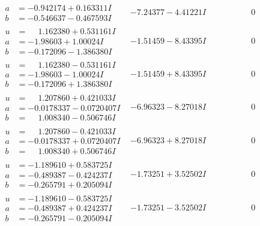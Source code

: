 \documentclass[1p]{elsarticle_modified}
\theoremstyle{definition}
\begin{document}
$$\begin{array}{c|c|c}
\begin{aligned}
a &= -0.942174 + 0.163311 I \\
b &= -0.546637 - 0.467593 I\end{aligned}
 & -7.24377 - 4.41221 I & \phantom{-0.000000 } 0 \\ \hline\begin{aligned}
u &= \phantom{-}1.162380 + 0.531161 I \\
a &= -1.98603 + 1.00024 I \\
b &= -0.172096 - 1.386380 I\end{aligned}
 & -1.51459 - 8.43395 I & \phantom{-0.000000 } 0 \\ \hline\begin{aligned}
u &= \phantom{-}1.162380 - 0.531161 I \\
a &= -1.98603 - 1.00024 I \\
b &= -0.172096 + 1.386380 I\end{aligned}
 & -1.51459 + 8.43395 I & \phantom{-0.000000 } 0 \\ \hline\begin{aligned}
u &= \phantom{-}1.207860 + 0.421033 I \\
a &= -0.0178337 - 0.0720407 I \\
b &= \phantom{-}1.008340 - 0.506746 I\end{aligned}
 & -6.96323 - 8.27018 I & \phantom{-0.000000 } 0 \\ \hline\begin{aligned}
u &= \phantom{-}1.207860 - 0.421033 I \\
a &= -0.0178337 + 0.0720407 I \\
b &= \phantom{-}1.008340 + 0.506746 I\end{aligned}
 & -6.96323 + 8.27018 I & \phantom{-0.000000 } 0 \\ \hline\begin{aligned}
u &= -1.189610 + 0.583725 I \\
a &= -0.489387 - 0.424237 I \\
b &= -0.265791 + 0.205094 I\end{aligned}
 & -1.73251 + 3.52502 I & \phantom{-0.000000 } 0 \\ \hline\begin{aligned}
u &= -1.189610 - 0.583725 I \\
a &= -0.489387 + 0.424237 I \\
b &= -0.265791 - 0.205094 I\end{aligned}
 & -1.73251 - 3.52502 I & \phantom{-0.000000 } 0 \\ \hline\begin{aligned}

\end{aligned}
\end{array}$$
\end{document}
